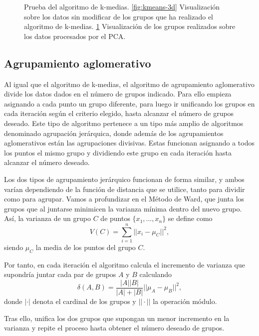 \begin{figure}[h]
\begin{subfigure}{0.45\textwidth}
    \caption{}
    \label{fig:kmeans-pca}
  \end{subfigure}
  \caption[Prueba del algoritmo de k-medias.]{Prueba del algoritmo de k-medias. \ref{fig:kmeans-3d} Visualización sobre los datos sin modificar de los grupos que ha realizado el algoritmo de k-medias. \ref{fig:kmeans-pca} Visualización de los grupos realizados sobre los datos procesados por el PCA.}
  \label{fig:kmeans}
\end{figure}

\newpage
\subsection{Agrupamiento aglomerativo}

Al igual que el algoritmo de k-medias, el algoritmo de agrupamiento aglomerativo divide los datos dados en el número de grupos indicado. Para ello empieza asignando a cada punto un grupo diferente, para luego ir unificando los grupos en cada iteración según el criterio elegido, hasta alcanzar el número de grupos deseado. Este tipo de algoritmo pertenece a un tipo más amplio de algoritmos denominado agrupación jerárquica, donde además de los agrupamientos aglomerativos están las agrupaciones divisivas. Estas funcionan asignando a todos los puntos el mismo grupo y dividiendo este grupo en cada iteración hasta alcanzar el número deseado.

Los dos tipos de agrupamiento jerárquico funcionan de forma similar, y ambos varían dependiendo de la función de distancia que se utilice, tanto para dividir como para agrupar. Vamos a profundizar en el Método de Ward, que junta los grupos que al juntarse minimicen la varianza mínima dentro del nuevo grupo. Así, la varianza de un grupo $ C $ de puntos $ \{x_1, ..., x_n\} $ se define como
\begin{equation}
  V(C) = \sum\limits_{i=1}^n || x_i - \mu_C ||^2,
\end{equation}
siendo $ \mu_C $ la media de los puntos del grupo $ C $.

Por tanto, en cada iteración el algoritmo calcula el incremento de varianza que supondría juntar cada par de grupos $ A $ y $ B $ calculando
\begin{equation}
  \delta(A, B) = \frac{|A||B|}{|A|+|B|}||\mu_A - \mu_B||^2,
\end{equation}
donde $ |\cdot| $ denota el cardinal de los grupos y $ || \cdot || $ la operación módulo.

Tras ello, unifica los dos grupos que supongan un menor incremento en la varianza y repite el proceso hasta obtener el número deseado de grupos.

